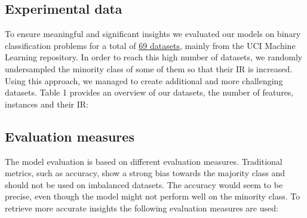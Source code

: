 \documentclass[parskip=full]{scrartcl}
\begin{document}
\subsection{Experimental data}

To ensure meaningful and significant insights we evaluated our models on binary classification problems for a total of \href{https://github.com/NOVA-IMS-Innovation-and-Analytics-Lab/publications/blob/master/imbalanced-learning/data/imbalanced.db}{69 datasets}, mainly from the UCI Machine Learning repository. In order to reach this high number of datasets, we randomly undersampled the minority class of some of them so that their IR is increased. Using this approach, we managed to create additional and more challenging datasets. Table 1 provides an overview of our datasets, the number of features, instances and their IR:


\subsection{Evaluation measures}

The model evaluation is based on different evaluation measures. Traditional metrics, such as accuracy, show a strong bias towards the majority class and should not be used on imbalanced datasets. The accuracy would seem to be precise, even though the model might not perform well on the minority class. To retrieve more accurate insights the following evaluation measures are used:
\end{document}
